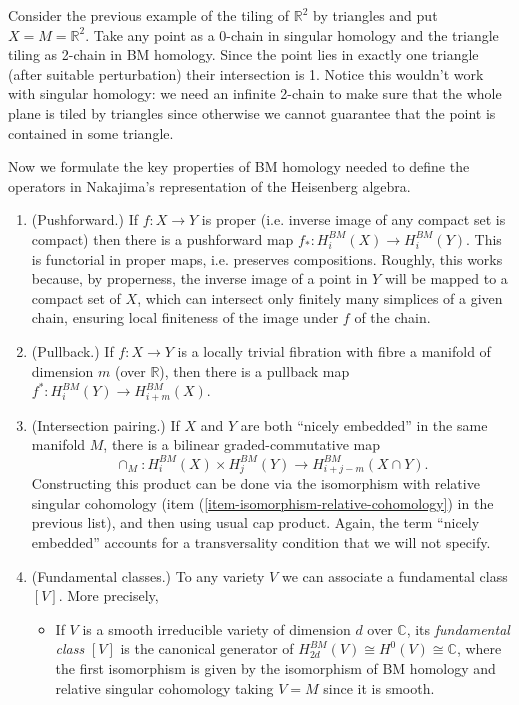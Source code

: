 Consider the previous example of
the tiling of $\mathbb{R}^2$
by triangles and put
$X=M=\mathbb{R}^2$.
Take any point as a 0-chain in singular
homology
and the triangle tiling as 2-chain in BM
homology.
Since the point lies in exactly one triangle
(after suitable perturbation)
their intersection is 1.
Notice this wouldn't work with
singular homology: we need an infinite
2-chain
to make sure that the whole plane
is tiled by triangles since
otherwise we cannot guarantee that the point
is contained in some triangle.

\medskip\noindent
Now we formulate the key properties
of BM homology needed to define the operators
in Nakajima's representation of the
Heisenberg algebra.

\begin{enumerate}
\item (Pushforward.)
\label{item-pushforward}
If $f:X \to Y$ is proper
(i.e. inverse image of any compact set is
compact)
then there is a pushforward map $f_*
:H_i^{BM}(X)\to H_i^{BM}(Y)$.
This is functorial in proper maps,
i.e. preserves compositions.
Roughly, this works because, by properness,
the inverse image of
a point in $Y$ will be mapped to a compact
set of $X$,
which can intersect only finitely many
simplices of a given chain,
ensuring local finiteness of the image under
$f$ of the chain.

\item
\label{item-pullback}
(Pullback.) If $f:X \to Y$
is a locally trivial fibration with
fibre a manifold of dimension $m$ (over
$\mathbb{R}$),
then there is a pullback map
$f^* :H_i^{BM}(Y)\to H_{i+m}^{BM}(X)$.

\item
\label{item-intersection}
(Intersection pairing.) If $X$ and $Y$
are both ``nicely embedded'' in the same
manifold $M$, there is a bilinear
graded-commutative map
$$
\cap_M:H_i^{BM}(X)\times H_j^{BM}(Y)
\to H_{i+j-m}^{BM}(X\cap Y).
$$
Constructing this product can be done
via the isomorphism with relative singular
cohomology
(item
(\ref{item-isomorphism-relative-cohomology})
in the previous list),
and then using usual cap product.
Again, the term ``nicely embedded'' accounts
for a transversality condition that we will
not
specify.

\item (Fundamental classes.)
\label{item-fundamental-class}
To any variety $V$ we can associate a
fundamental class $[V]$.
More precisely,
\begin{itemize}
\item If $V$ is a smooth irreducible variety
of dimension $d$ over $\mathbb{C}$,
its {\it fundamental class} $[V]$ is the
canonical generator of
$H_{2d}^{BM}(V)\cong H^0(V)\cong \mathbb{C}$,
where the first isomorphism
is given by the isomorphism of BM homology
and
relative singular cohomology taking $V = M$
since it is smooth.


\end{itemize}
\end{enumerate}
